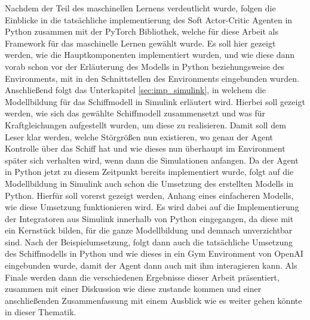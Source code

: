 \documentclass[]{iat}
\begin{document}
Nachdem der Teil des maschinellen Lernens verdeutlicht wurde, folgen die Einblicke in die tatsächliche implementierung des Soft Actor-Critic Agenten in Python zusammen mit der PyTorch Bibliothek, welche für diese Arbeit als Framework für das maschinelle Lernen gewählt wurde. Es soll hier gezeigt werden, wie die Hauptkomponenten implementiert wurden, und wie diese dann vorab schon vor der Erläuterung des Modells in Python beziehungsweise des Environments, mit in den Schnittstellen des Environments eingebunden wurden. Anschließend folgt das Unterkapitel \ref{sec:imp_simulink}, in welchem die Modellbildung für das Schiffmodell in Simulink erläutert wird. Hierbei soll gezeigt werden, wie sich das gewählte Schiffmodell zusammensetzt und was für Kraftgleichungen aufgestellt wurden, um diese zu realisieren. Damit soll dem Leser klar werden, welche Störgrößen nun existieren, wo genau der Agent Kontrolle über das Schiff hat und wie dieses nun überhaupt im Environment später sich verhalten wird, wenn dann die Simulationen anfangen. Da der Agent in Python jetzt zu diesem Zeitpunkt bereits implementiert wurde, folgt auf die Modellbildung in Simulink auch schon die Umsetzung des erstellten Modells in Python. Hierfür soll vorerst gezeigt werden, Anhang eines einfacheren Modells, wie diese Umsetzung funktionieren wird. Es wird dabei auf die Implementierung der Integratoren aus Simulink innerhalb von Python eingegangen, da diese mit ein Kernstück bilden, für die ganze Modellbildung und demnach unverzichtbar sind. Nach der Beispielumsetzung, folgt dann auch die tatsächliche Umsetzung des Schiffmodells in Python und wie dieses in ein Gym Environment von OpenAI eingebunden wurde, damit der Agent dann auch mit ihm interagieren kann. Als Finale werden dann die verschiedenen Ergebnisse dieser Arbeit präsentiert, zusammen mit einer Diskussion wie diese zustande kommen und einer anschließenden Zusammenfassung mit einem Ausblick wie es weiter gehen könnte in dieser Thematik.
\end{document}

